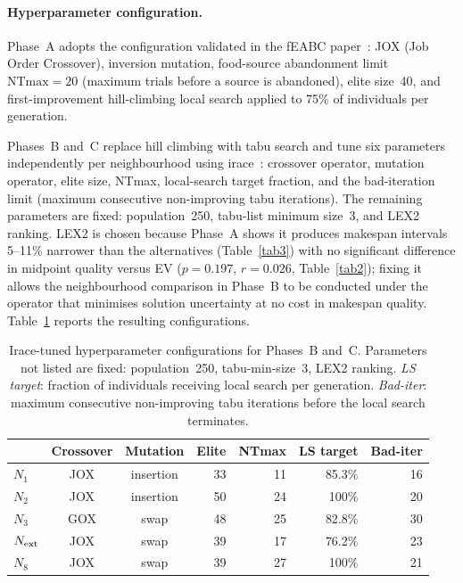 \documentclass[preprint,12pt]{elsarticle}
\begin{document}
\paragraph{Hyperparameter configuration.}
Phase~A adopts the configuration validated in the fEABC paper~\cite{DiazFEABC2023}: JOX (Job Order Crossover), inversion mutation, food-source abandonment limit $\text{NTmax}=20$ (maximum trials before a source is abandoned), elite size~40, and first-improvement hill-climbing local search applied to 75\% of individuals per generation.

Phases~B and~C replace hill climbing with tabu search and tune six parameters independently per neighbourhood using irace~\cite{Lopez2016}: crossover operator, mutation operator, elite size, NTmax, local-search target fraction, and the bad-iteration limit (maximum consecutive non-improving tabu iterations). The remaining parameters are fixed: population~250, tabu-list minimum size~3, and LEX2 ranking. LEX2 is chosen because Phase~A shows it produces makespan intervals 5--11\% narrower than the alternatives (Table~\ref{tab3}) with no significant difference in midpoint quality versus EV ($p = 0.197$, $r = 0.026$, Table~\ref{tab2}); fixing it allows the neighbourhood comparison in Phase~B to be conducted under the operator that minimises solution uncertainty at no cost in makespan quality. Table~\ref{tab:tuned} reports the resulting configurations.

\begin{table}[htbp]
\centering
\caption{Irace-tuned hyperparameter configurations for Phases~B and~C. Parameters not listed are fixed: population~250, tabu-min-size~3, LEX2 ranking. \emph{LS target}: fraction of individuals receiving local search per generation. \emph{Bad-iter}: maximum consecutive non-improving tabu iterations before the local search terminates.}
\label{tab:tuned}
\begin{tabular}{l c c r r r r}
\hline
 & Crossover & Mutation & Elite & NTmax & LS target & Bad-iter \\
\hline
$N_1$         & JOX & insertion & 33 & 11 & 85.3\% & 16 \\
$N_2$         & JOX & insertion & 50 & 24 & 100\%  & 20 \\
$N_3$         & GOX & swap      & 48 & 25 & 82.8\% & 30 \\
$N_{\rm ext}$ & JOX & swap      & 39 & 17 & 76.2\% & 23 \\
$N_8$         & JOX & swap      & 39 & 27 & 100\%  & 21 \\
\hline
\end{tabular}
\end{table}
\end{document}
